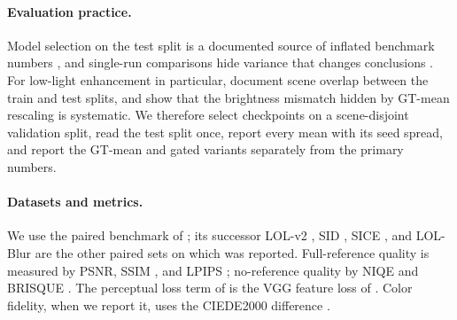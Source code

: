 \paragraph{Evaluation practice.} Model selection on the test split is a documented source
of inflated benchmark numbers \citep{musgrave2020reality, recht2019imagenet}, and
single-run comparisons hide variance that changes conclusions
\citep{bouthillier2021variance, pineau2021reproducibility}. For low-light enhancement in
particular, \citet{nguyen2024diffusiondark} document scene overlap between the \dataset
train and test splits, and \citet{liao2025gtmean} show that the brightness mismatch hidden
by GT-mean rescaling is systematic. We therefore select checkpoints on a scene-disjoint
validation split, read the test split once, report every mean with its seed spread, and
report the GT-mean and gated variants separately from the primary numbers.

\paragraph{Datasets and metrics.} We use the paired \dataset benchmark of
\citet{wei2018retinex}; its successor LOL-v2 \citep{yang2021lolv2}, SID \citep{chen2018sid},
SICE \citep{cai2018sice}, and LOL-Blur \citep{zhou2022lolblur} are the other paired sets on
which \mname was reported. Full-reference quality is measured by PSNR, SSIM
\citep{wang2004ssim}, and LPIPS \citep{zhang2018lpips}; no-reference quality by NIQE
\citep{mittal2013niqe} and BRISQUE \citep{mittal2012brisque}. The perceptual loss term of \mname is the VGG feature loss of
\citet{johnson2016perceptual}. Color fidelity, when we report it, uses the CIEDE2000
difference \citep{sharma2005ciede2000}.
